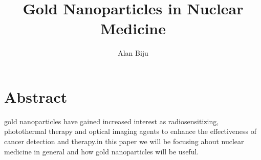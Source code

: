 \documentclass{article}
\begin{document}
\title{Gold Nanoparticles in Nuclear Medicine }
\author{Alan Biju}


\maketitle


\section*{Abstract}

gold nanoparticles have gained increased interest as radiosensitizing, photothermal therapy and optical imaging agents to enhance the effectiveness of cancer detection and therapy.in this paper we will be focusing about nuclear medicine in general and how gold nanoparticles will be useful.
\end{document}
